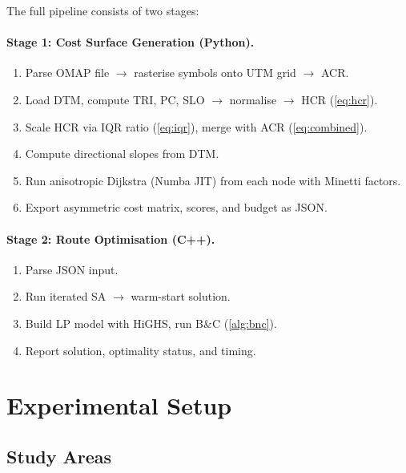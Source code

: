 \documentclass[11pt,a4paper]{article}
\begin{document}
The full pipeline consists of two stages:

\paragraph{Stage 1: Cost Surface Generation (Python).}
\begin{enumerate}[nosep]
  \item Parse OMAP file $\to$ rasterise symbols onto UTM grid $\to$ ACR.
  \item Load DTM, compute TRI, PC, SLO $\to$ normalise $\to$ HCR (\cref{eq:hcr}).
  \item Scale HCR via IQR ratio (\cref{eq:iqr}), merge with ACR (\cref{eq:combined}).
  \item Compute directional slopes from DTM.
  \item Run anisotropic Dijkstra (Numba JIT) from each node with Minetti factors.
  \item Export asymmetric cost matrix, scores, and budget as JSON.
\end{enumerate}

\paragraph{Stage 2: Route Optimisation (C++).}
\begin{enumerate}[nosep]
  \item Parse JSON input.
  \item Run iterated SA $\to$ warm-start solution.
  \item Build LP model with HiGHS, run B\&C (\cref{alg:bnc}).
  \item Report solution, optimality status, and timing.
\end{enumerate}

\section{Experimental Setup}
\label{sec:experiments}

\subsection{Study Areas}
\end{document}
